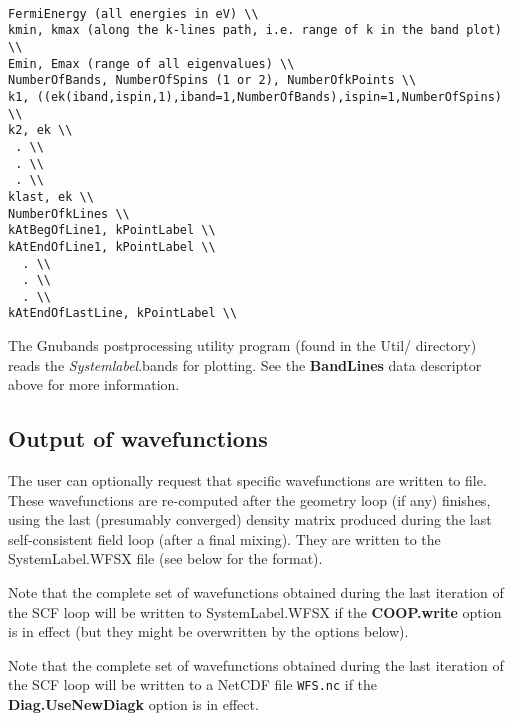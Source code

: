 \documentclass[11pt]{article}
\begin{document}
\begin{verbatim}

FermiEnergy (all energies in eV) \\
kmin, kmax (along the k-lines path, i.e. range of k in the band plot) \\
Emin, Emax (range of all eigenvalues) \\
NumberOfBands, NumberOfSpins (1 or 2), NumberOfkPoints \\
k1, ((ek(iband,ispin,1),iband=1,NumberOfBands),ispin=1,NumberOfSpins) \\
k2, ek \\
 . \\
 . \\
 . \\
klast, ek \\
NumberOfkLines \\
kAtBegOfLine1, kPointLabel \\
kAtEndOfLine1, kPointLabel \\
  . \\
  . \\
  . \\
kAtEndOfLastLine, kPointLabel \\
\end{verbatim}

\noindent
The {\sc Gnubands} postprocessing
utility program (found in the Util/ directory) reads the {\it
  Systemlabel}.bands for plotting.  See the {\bf BandLines} data
descriptor above for more information.

\subsection{Output of wavefunctions}
\label{sec:wf-output-user}

The user can optionally request that specific wavefunctions are
written to file. These wavefunctions are re-computed after the
geometry loop (if any) finishes, using the last (presumably converged)
density matrix produced during the last self-consistent field loop
(after a final mixing). They are written to the SystemLabel.WFSX file
(see below for the format).

Note that the complete set of wavefunctions obtained during the last
iteration of the SCF loop will be written to SystemLabel.WFSX
if the {\bf COOP.write} option is in effect (but they might be
overwritten by the options below).

Note that the complete set of wavefunctions obtained during the last
iteration of the SCF loop will be written to a NetCDF file
{\tt WFS.nc} if the {\bf Diag.UseNewDiagk} option is in effect.
\end{document}
